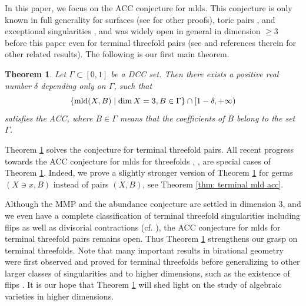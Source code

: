 \documentclass[11pt]{amsart}
\numberwithin{equation}{section}
\newcommand{\mld}{{\rm{mld}}}
\newcommand{\Ii}{{\Gamma}}
\newtheorem{thm}{Theorem}[section]
\theoremstyle{definition}
\theoremstyle{definition}
\begin{document}
\medskip

In this paper, we focus on the ACC conjecture for mlds. This conjecture is only known in full generality for surfaces \cite{Ale93} (see \cite{Sho94b,HL20} for other proofs), toric pairs \cite{Amb06}, and exceptional singularities \cite{HLS19}, and was widely open in general in dimension $\geq 3$ before this paper even for terminal threefold pairs (see \cite{HLS19} and references therein for other related results). The following is our first main theorem.

\begin{thm}\label{thm: intro global canonical mld acc}
Let $\Ii\subset [0,1]$ be a DCC set. Then there exists a positive real number $\delta$ depending only on $\Ii$, such that 
$$\{\mld(X,B)\mid \dim X=3, B\in \Ii\}\cap [1-\delta,+\infty)$$
satisfies the ACC, where $B\in\Ii$ means that the coefficients of $B$ belong to the set $\Ii$.
\end{thm}

Theorem \ref{thm: intro global canonical mld acc} solves the conjecture for terminal threefold pairs. All recent progress towards the ACC conjecture for mlds for threefolds \cite[Theorem 1.3]{Kaw15b}, \cite[Corollary 1.5]{Nak16}, \cite[Theorem 1.3]{Jia21} are special cases of Theorem \ref{thm: intro global canonical mld acc}. Indeed, we prove a slightly stronger version of Theorem \ref{thm: intro global canonical mld acc} for germs $(X\ni x,B)$ instead of pairs $(X,B)$, see Theorem \ref{thm:  terminal mld acc}. 


 Although the MMP and the abundance conjecture are settled in dimension 3, and we even have a complete classification of terminal threefold singularities including flips as well as divisorial contractions (cf. \cite{Mor85,Rei87,KM92,Kaw01,Kaw02,Kaw03,Kaw05,Kaw12,Yam18}), the ACC conjecture for mlds for terminal threefold pairs remains open. Thus Theorem \ref{thm: intro global canonical mld acc} strengthens our grasp on terminal threefolds. Note that many important results in birational geometry were first observed and proved for terminal threefolds before generalizing to other larger classes of singularities and to higher dimensions, such as the existence of flips \cite{Mor88,Sho92}. It is our hope that Theorem \ref{thm: intro global canonical mld acc} will shed light on the study of algebraic varieties in higher dimensions. 
\end{document}

